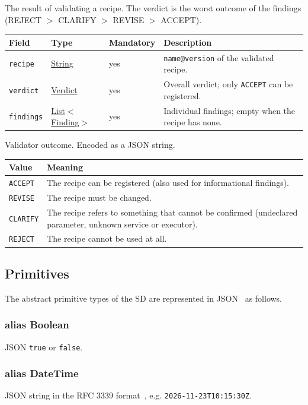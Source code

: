\documentclass[a4paper]{arrowhead}
\newcommand{\mref}[1]{{\textcolor{ArrowheadPurple}{\hyperref[sec:model:#1]{#1}}}}
\newcommand{\pdef}[1]{{\textcolor{ArrowheadGrey}{#1\label{sec:model:primitives:#1}\label{sec:model:primitives:#1s}}}}
\newcommand{\pref}[1]{{\textcolor{ArrowheadGrey}{\hyperref[sec:model:primitives:#1]{#1}}}}
\begin{document}
The result of validating a recipe. The verdict is the worst outcome of the findings (REJECT $>$ CLARIFY $>$ REVISE $>$ ACCEPT).

{\small
\begin{longtable}{|p{3.7cm}|p{4.2cm}|p{1.6cm}|p{6.3cm}|}

\hline
\rowcolor{gray!33} Field & Type & Mandatory & Description \\ \hline
\endhead
\texttt{recipe} & \pref{String} & yes & \texttt{name@version} of the validated recipe. \\ \hline
\texttt{verdict} & \mref{Verdict} & yes & Overall verdict; only \texttt{ACCEPT} can be registered. \\ \hline
\texttt{findings} & \pref{List}$<$\mref{Finding}$>$ & yes & Individual findings; empty when the recipe has none. \\ \hline
\end{longtable}
}

Validator outcome.
 Encoded as a JSON string.
{\small
\begin{longtable}{|p{3.9cm}|p{11.9cm}|}

\hline
\rowcolor{gray!33} Value & Meaning \\ \hline
\endhead
\texttt{ACCEPT} & The recipe can be registered (also used for informational findings). \\ \hline
\texttt{REVISE} & The recipe must be changed. \\ \hline
\texttt{CLARIFY} & The recipe refers to something that cannot be confirmed (undeclared parameter, unknown service or executor). \\ \hline
\texttt{REJECT} & The recipe cannot be used at all. \\ \hline
\end{longtable}
}


\subsection{Primitives}
\label{sec:model:primitives}
The abstract primitive types of the SD are represented in JSON~\cite{rfc8259} as follows.
\subsubsection*{alias \pdef{Boolean}}
JSON \texttt{true} or \texttt{false}.

\subsubsection*{alias \pdef{DateTime}}
JSON string in the RFC 3339 format~\cite{rfc3339}, e.g. \texttt{2026-11-23T10:15:30Z}.
\end{document}
